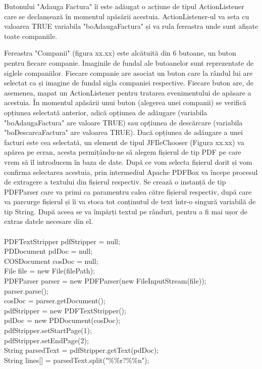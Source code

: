 \documentclass[12pt]{book}
\begin{document}
Butonului "Adauga Factura" îi este adăugat o acțiune de tipul ActionListener care se declanșează în momentul apăsării acestuia. ActionListener-ul va seta cu valoarea TRUE variabila "boAdaugaFactura" și va rula fereastra unde sunt afișate toate companiile.

Fereastra "Companii" (figura xx.xx) este alcătuită din 6 butoane, un buton pentru fiecare companie. Imaginile de fundal ale butoanelor sunt reprezentate de siglele companiilor. Fiecare companie are asociat un buton care la rândul lui are selectat ca și imagine de fundal sigla companiei respective. Fiecare buton are, de asemenea, mapat un ActionListener pentru tratarea evenimentului de apăsare a acestuia.  În momentul apăsării unui buton (alegerea unei companii) se verifică opțiunea selectată anterior, adică opțiunea de adăugare (variabila "boAdaugaFactura" are valoare TRUE) sau opțiunea de descărcare (variabila "boDescarcaFactura" are valoarea TRUE). Dacă opțiunea de adăugare a unei facturi este cea selectată, un element de tipul JFIleChooser (Figura xx.xx) va apărea pe ecran, acesta permițându-ne să alegem fișierul de tip PDF pe care vrem să îl introducem în baza de date. 
După ce vom selecta fișierul dorit și vom confirma selectarea acestuia, prin intermediul Apache PDFBox va începe procesul de extragere a textului din fișierul respectiv. Se crează o instanță de tip PDFParser care va primi ca paramentru calea către fișierul respectiv, după care va parcurge fișierul și îi va stoca tot conținutul de text într-o singură variabilă de tip String. După aceea se va împărți textul pe rânduri, pentru a fi mai ușor de extras datele necesare din el. \\\\
PDFTextStripper pdfStripper = null;\\
PDDocument pdDoc = null;\\
COSDocument cosDoc = null;\\
File file = new File(filePath);\\
PDFParser parser = new PDFParser(new FileInputStream(file));\\
parser.parse();\\
cosDoc = parser.getDocument();\\
pdfStripper = new PDFTextStripper();\\
pdDoc = new PDDocument(cosDoc);\\
pdfStripper.setStartPage(1);\\
pdfStripper.setEndPage(2);\\
String parsedText = pdfStripper.getText(pdDoc);\\
String lines[] = parsedText.split("\%\%r?\%\%n");\\
\end{document}
